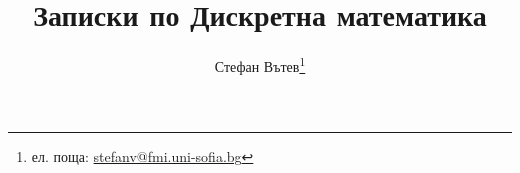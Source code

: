 \documentclass[a4paper,10pt]{report}
\title{Записки по Дискретна математика}
\author{Стефан Вътев\thanks{ел. поща: \href{stefanv@fmi.uni-sofia.bg}{stefanv@fmi.uni-sofia.bg}}}
\theoremstyle{definition}
\begin{document}
\maketitle
\layout

\tableofcontents









% 
% 
% 
%
% 


% 



\printindex
\end{document}
